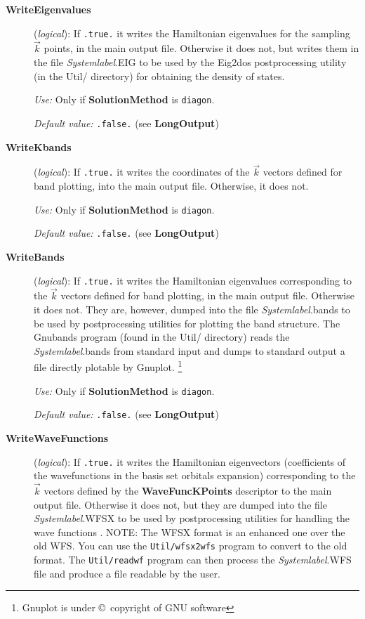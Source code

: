 \documentclass[11pt]{article}
\begin{document}
\begin{description}
 
\item[{\bf WriteEigenvalues}] ({\it logical}):
If {\tt .true.} it writes the Hamiltonian eigenvalues for the sampling
$\vec k$ points, in the main output file.
Otherwise it does not, but writes them in the file {\it Systemlabel}.EIG
to be used by the {\sc Eig2dos} postprocessing 
utility (in the Util/ directory) for obtaining the density of
states.

{\it Use:} Only if {\bf SolutionMethod} is {\tt diagon}.
 
{\it Default value:} {\tt .false.} (see {\bf LongOutput})

\item[{\bf WriteKbands}] ({\it logical}):
If {\tt .true.} it writes the coordinates of the $\vec k$ vectors
defined for band plotting, into the main output file.
Otherwise, it does not.

{\it Use:} Only if {\bf SolutionMethod} is {\tt diagon}.

{\it Default value:} {\tt .false.} (see {\bf LongOutput})


\item[{\bf WriteBands}] ({\it logical}):  If {\tt .true.} it writes
the Hamiltonian eigenvalues corresponding to the $\vec k$ vectors
defined for band plotting, in the main output file.  Otherwise it does
not. They are, however, dumped into the file {\it Systemlabel}.bands
to be used by postprocessing utilities for plotting the band
structure. The {\sc Gnubands} program
(found in the Util/ directory) reads the {\it Systemlabel}.bands from
standard input and dumps to standard output a file directly plotable
by {\sc Gnuplot}.
\footnote{{\sc Gnuplot} is under \copyright\ copyright of GNU software}

{\it Use:} Only if {\bf SolutionMethod} is {\tt diagon}.
 
{\it Default value:} {\tt .false.} (see {\bf LongOutput})

\item[{\bf WriteWaveFunctions}] ({\it logical}): 
 If {\tt .true.} it writes
the Hamiltonian eigenvectors (coefficients of the wavefunctions
in the basis set orbitals expansion) corresponding to the $\vec k$ vectors
defined by the {\bf WaveFuncKPoints}
descriptor to the main output file.  Otherwise it does
not, but they are dumped into the file {\it Systemlabel}.WFSX
to be used by postprocessing utilities for handling the 
wave functions
. NOTE: The WFSX format is an enhanced one
over the old WFS. You can use the {\tt Util/wfsx2wfs} program to
convert to the old format. The {\tt Util/readwf} program
can then process the {\it Systemlabel}.WFS file and produce
a file readable by the user.


\end{description}
\end{document}
